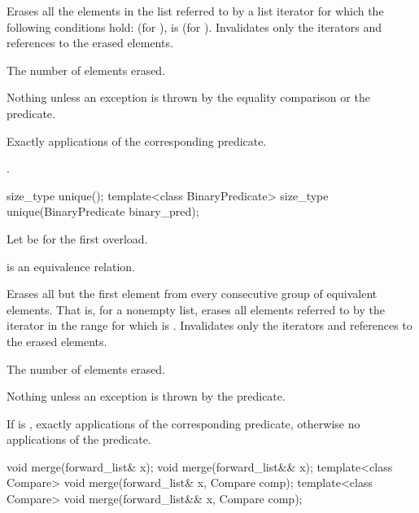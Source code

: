 \begin{itemdescr}
\pnum
\effects
Erases all the elements in the list referred to by a list iterator  for
which the following conditions hold:  (for ),
 is  (for ).
Invalidates only the iterators and references to the erased elements.

\pnum
\returns
The number of elements erased.

\pnum
\throws
Nothing unless an exception is thrown by the equality comparison or the
predicate.

\pnum
\complexity
Exactly  applications of the corresponding
predicate.

\pnum
\remarks
{}.
\end{itemdescr}

%
\begin{itemdecl}
size_type unique();
template<class BinaryPredicate> size_type unique(BinaryPredicate binary_pred);
\end{itemdecl}

\begin{itemdescr}
\pnum
Let  be  for the first overload.

\pnum
\expects
{} is an equivalence relation.

\pnum
\effects
Erases all but the first element from every consecutive
group of equivalent elements.
That is, for a nonempty list, erases all elements referred to
by the iterator  in the range 
for which  is .
Invalidates only the iterators and references to the erased elements.

\pnum
\returns
The number of elements erased.

\pnum
\throws
Nothing unless an exception is thrown by the predicate.

\pnum
\complexity
If  is ,
exactly  applications of
the corresponding predicate,
otherwise no applications of the predicate.
\end{itemdescr}

%
\begin{itemdecl}
void merge(forward_list& x);
void merge(forward_list&& x);
template<class Compare> void merge(forward_list& x, Compare comp);
template<class Compare> void merge(forward_list&& x, Compare comp);
\end{itemdecl}

